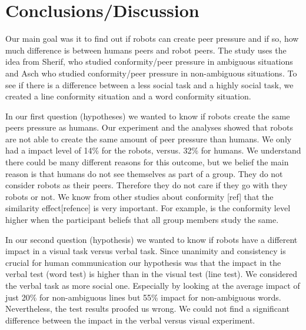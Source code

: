 \documentclass{acm_proc_article-sp}
\begin{document}







\section{Conclusions/Discussion}
Our main goal was it to find out if robots can create peer pressure and if so, how much difference is between humans peers and robot peers. The study uses the idea from Sherif, who studied conformity/peer pressure in ambiguous situations and Asch who studied conformity/peer pressure in non-ambiguous situations. To see if there is a difference between a less social task and a highly social task, we created a line conformity situation and a word conformity situation.  

In our first question (hypotheses) we wanted to know if robots create the same peers pressure as humans. Our experiment and the analyses showed that robots are not able to create the same amount of peer pressure than humans. We only had a impact level of 14\% for the robots, versus. 32\% for humans. We understand there could be many different reasons for this outcome, but we belief the main reason is that humans do not see themselves as part of a group. They do not consider robots as their peers. Therefore they do not care if they go with they robots or not. We know from other studies about conformity [ref] that the similarity effect[refence] is very important. For example, is the conformity level higher when the participant beliefs that all group members study the same. 


In our second question (hypothesis) we wanted to know if robots have a different impact in a visual task versus verbal task. Since unanimity and consistency is crucial for human communication our hypothesis was that the impact in the verbal test (word test) is higher than in the visual test (line test). We considered the verbal task as more social one. Especially by looking at the average impact of just 20\% for non-ambiguous lines but 55\% impact for non-ambiguous words. Nevertheless, the test results proofed us wrong. We could not find a significant difference between the impact in the verbal versus visual experiment. 
\end{document}

